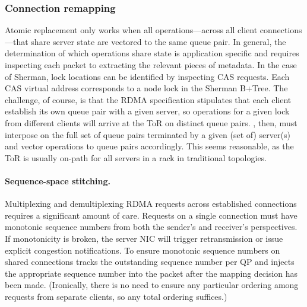 

\subsubsection{Connection remapping}

Atomic replacement only works when all operations---across all client
connections---that share server state are vectored to the same queue
pair.  In general, the determination of which operations share state
is application specific and requires inspecting each packet to
extracting the relevant pieces of metadata.  In the
case of Sherman, lock locations can be identified by inspecting CAS
requests. Each CAS virtual address corresponds to a node lock in the
Sherman B+Tree.
The challenge, of course, is that the RDMA specification stipulates
that each client establish its own queue pair with a given server, so
operations for a given lock from different clients will arrive at the
ToR on distinct queue pairs.  \sword, then, must interpose on the full
set of queue pairs terminated by a given (set of) server(s) and vector
operations to queue pairs accordingly.  This seems reasonable, as the
ToR is usually on-path for all servers in a rack in traditional
topologies.

\paragraph{Sequence-space stitching.}

Multiplexing and demultiplexing RDMA requests across established
connections requires a significant amount of care. Requests on a
single connection must have monotonic sequence numbers from both the
sender's and receiver's perspectives. If monotonicity is broken, the
server NIC will trigger retransmission or issue explicit congestion
notifications. To ensure monotonic sequence numbers on shared
connections {\sword} tracks the outstanding sequence number per QP and
injects the appropriate sequence number into the packet after the
mapping decision has been made.  (Ironically, there is no need to
ensure any particular ordering among requests from separate clients,
so any total ordering suffices.)

